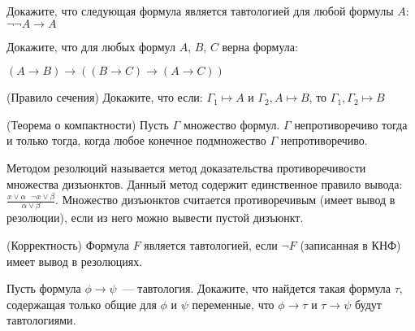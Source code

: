 \setcounter{curtask}{1}

\begin{task}
    Докажите, что следующая формула является тавтологией для любой
    формулы $A$: $\neg\neg A \rightarrow A$
\end{task}

\begin{task}
    Докажите, что для любых формул $A$, $B$, $C$ верна формула:
    \begin{center}
        $(A \rightarrow B) \rightarrow ((B \rightarrow C) \rightarrow (A
	    \rightarrow C))$
    \end{center}
\end{task}

\begin{task} (Правило сечения)
    Докажите, что если: $\Gamma_1 \mapsto A$ и $\Gamma_2, A \mapsto
    B$, то $\Gamma_1, \Gamma_2 \mapsto B$
\end{task}

\begin{task} (Теорема о компактности)
    Пусть $\Gamma$ множество формул. $\Gamma$ непротиворечиво тогда и
    только тогда, когда любое конечное подмножество $\Gamma$ непротиворечиво.
\end{task}

\vspace{0.5cm}
Методом резолюций называется метод доказательства противоречивости
множества дизъюнктов. Данный метод содержит единственное правило
вывода: $\frac{x \vee \alpha \ \ \ \neg x \vee \beta}{\alpha \vee
  \beta}$. Множество дизъюнктов считается противоречивым (имеет вывод
в резолюции), если из него можно вывести пустой дизъюнкт.

\begin{task} (Корректность)
    Формула $F$ является тавтологией, если $\neg F$ (записанная в КНФ)
    имеет вывод в резолюциях.
\end{task}

\begin{task}
    Пусть формула $\phi \rightarrow \psi$~--- тавтология. Докажите,
    что найдется такая формула $\tau$, содержащая только общие для
    $\phi$ и $\psi$ переменные, что $\phi \rightarrow \tau$ и
    $\tau \rightarrow \psi$ будут тавтологиями.
\end{task}